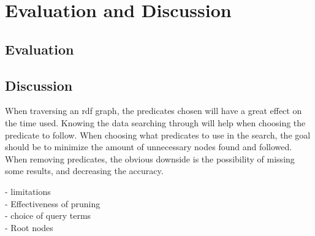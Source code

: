 \chapter{Evaluation and Discussion}
\label{cha:Discussion}

\section{Evaluation}
\label{sec:Evaluation}


\section{Discussion}
\label{sec:Discussion}

When traversing an rdf graph, the predicates chosen will have a great effect on the time used. Knowing the data searching through will help when choosing the predicate to follow. When choosing what predicates to use in the search, the goal should be to minimize the amount of unnecessary nodes found and followed. When removing predicates, the obvious downside is the possibility of missing some results, and decreasing the accuracy.

- limitations\\
- Effectiveness of pruning\\
- choice of query terms\\
- Root nodes\\
